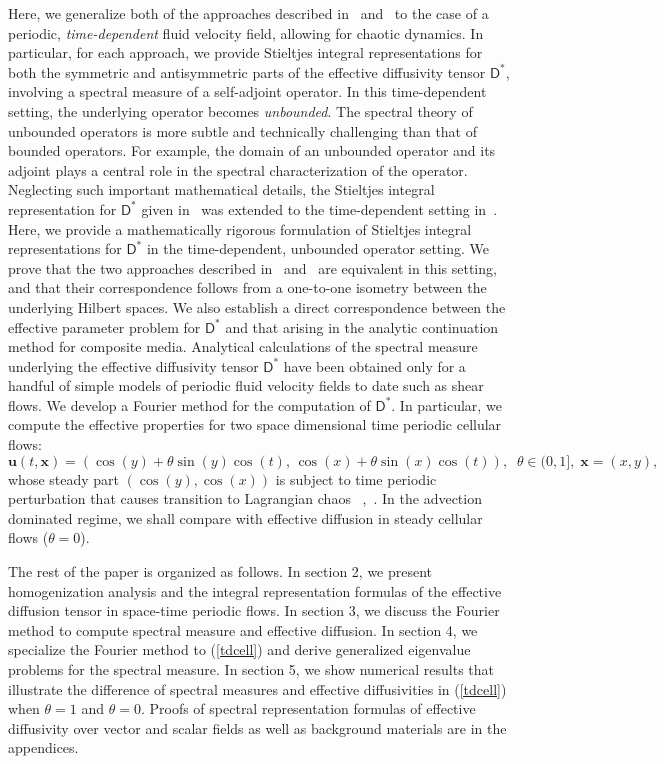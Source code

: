 \documentclass[leqno,onefignum,onetabnum]{siamltex1213}
\newcommand{\Dm}{\mathsf{D}}
\newcommand{\vecx}{\boldsymbol{x}}
\newcommand{\vecu}{\boldsymbol{u}}
\begin{document}
Here, we generalize both of the approaches described
in~\cite{Avellaneda:PRL-753,Avellaneda:CMP-339}
and~\cite{Pavliotis:PHD_Thesis} to the case of a periodic,
\emph{time-dependent} fluid velocity field, allowing for chaotic
dynamics. In particular, for each approach, we provide Stieltjes
integral representations for both the symmetric and antisymmetric
parts of the effective diffusivity tensor $\Dm^*$, involving a
spectral measure of a self-adjoint operator. In this time-dependent
setting, the underlying operator becomes \emph{unbounded}. The
spectral theory of unbounded operators is more subtle and technically
challenging than that of bounded operators. For example, the domain of
an unbounded operator and its adjoint plays a central role in the
spectral characterization of the operator. Neglecting such important
mathematical details, the Stieltjes integral representation for
$\Dm^*$ given in~\cite{Avellaneda:PRL-753,Avellaneda:CMP-339} was
extended to the time-dependent setting
in~\cite{Avellaneda:PRE:3249}. Here, we provide a mathematically
rigorous formulation of Stieltjes integral representations for $\Dm^*$
in the time-dependent, unbounded operator setting. We prove that the
two approaches described
in~\cite{Avellaneda:PRL-753,Avellaneda:CMP-339}
and~\cite{Pavliotis:PHD_Thesis} are equivalent in this setting, and
that their correspondence follows from a one-to-one isometry between
the underlying Hilbert spaces. We also establish a direct
correspondence between the effective parameter problem for $\Dm^*$ and
that arising in the analytic continuation method for composite
media. Analytical calculations of the spectral measure underlying the
effective diffusivity tensor $\Dm^*$ have been obtained
only for a handful of simple models of periodic fluid velocity
fields to date such as shear flows. We develop a 
Fourier method for the computation of $\Dm^*$. In particular, we 
compute the effective properties
for two space dimensional time periodic cellular flows:
\begin{equation}
\vecu (t,\vecx)=(\cos(y) + \theta \sin( y)\cos(t), \, \cos( x) + \theta \sin(x)\cos(t)), \; \; 
\theta \in (0,1], \; \vecx=(x,y), \label{tdcell}
\end{equation} 
whose steady part $(\cos (y), \cos(x))$ is subject to 
time periodic perturbation that causes transition to 
Lagrangian chaos ~\cite{Biferale:PF:2725},~\cite{ZCX_2015}.
In the advection dominated regime, we shall  
compare with effective diffusion in steady cellular flows ($\theta=0$). 
          
The rest of the paper is organized as follows. In section 2, we present 
homogenization analysis and the integral representation formulas of 
the effective diffusion tensor in space-time periodic flows. In section 3, 
we discuss the Fourier method to compute spectral measure and 
effective diffusion. In section 4, we specialize the Fourier method to (\ref{tdcell})
and derive generalized eigenvalue problems for the spectral measure. In section 5, we 
show numerical results that illustrate the difference of spectral measures and 
effective diffusivities in (\ref{tdcell}) when $\theta =1$ and $\theta=0$.
Proofs of spectral representation formulas of effective diffusivity over vector and scalar 
fields as well as background materials are in the appendices.
\end{document}
